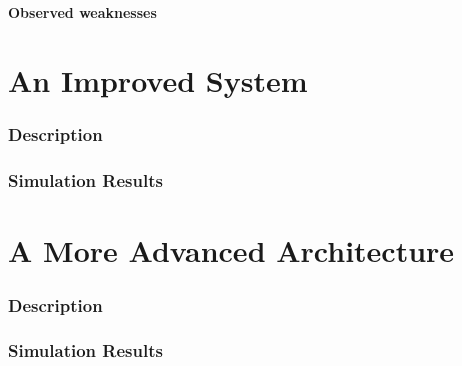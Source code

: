 \documentclass{article}
\begin{document}
\subsection{Observed weaknesses}
\part{An Improved System}

\section{Description}
\section{Simulation Results}
\part{A More Advanced Architecture}

\section{Description}
\section{Simulation Results}



\end{document}
